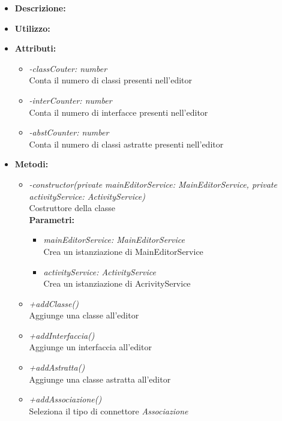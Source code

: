 \begin{itemize}
	\item \textbf{Descrizione:}\\
	
	\item \textbf{Utilizzo:}\\
	
	\item \textbf{Attributi:}
		\begin{itemize}
			\item \emph{-classCouter: number}\\
			Conta il numero di classi presenti nell'editor
			\item \emph{-interCounter: number}\\
			Conta il numero di interfacce presenti nell'editor
			\item \emph{-abstCounter: number}\\
			Conta il numero di classi astratte presenti nell'editor
		\end{itemize}
	\item \textbf{Metodi:}
		\begin{itemize}
			\item \emph{-constructor(private mainEditorService: MainEditorService, private activityService: ActivityService)}\\
    		Costruttore della classe\\
    		\textbf{Parametri:}
    		\begin{itemize}
    			\item \emph{mainEditorService: MainEditorService}\\
    			Crea un istanziazione di MainEditorService
    			\item \emph{activityService: ActivityService}\\
    			Crea un istanziazione di AcrivityService
    		\end{itemize}
    		\item \emph{+addClasse()}\\
    		Aggiunge una classe all'editor
    		\item \emph{+addInterfaccia()}\\
    		Aggiunge un interfaccia all'editor
    		\item \emph{+addAstratta()}\\
    		Aggiunge una classe astratta all'editor
    		\item \emph{+addAssociazione()}\\
    		Seleziona il tipo di connettore \textit{Associazione}

\end{itemize}
\end{itemize}

